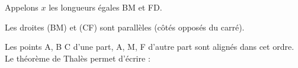 \documentclass[10pt]{article}
\begin{document}
\setlength\parindent{0mm}
\pagestyle{fancy}
\thispagestyle{empty}
    
    
    




\medskip

%
% 
%
%
% 
% 
% 
%
%
Appelons $x$ les longueurs égales BM et FD.

Les droites (BM) et (CF) sont parallèles (côtés opposés du carré).

Les points A, B C d’une part, A, M, F d’autre part sont alignés dans cet ordre. Le théorème de Thalès permet d’écrire :
\end{document}
